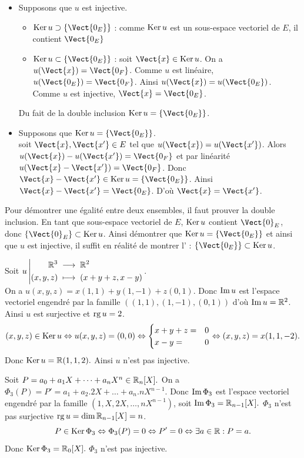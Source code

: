 \documentclass{book}
\begin{document}
\begin{Demonstration}  
\begin{itemize}
\item Supposons que $u$ est injective.
 \begin{itemize}
\item $\Ker u \supset \{\Vect{0_E}\}$ : comme $\operatorname{Ker} u$ est un sous-espace vectoriel de $E$, il contient $\Vect{0_E}$
\item $\Ker u \subset \{\Vect{0_E}\}$ : soit $\Vect{x}\in \Ker u $. On a $u(\Vect{x})=\Vect{0_F}$. Comme $u$ est linéaire, $u(\Vect{0_E})=\Vect{0_F}$. Ainsi 
$u(\Vect{x})=u(\Vect{0_E})$. Comme $u$ est injective, $\Vect{x}=\Vect{0_E}$.
\end{itemize}
Du fait de la double inclusion $\Ker u = \{\Vect{0_E}\}$.
\item  Supposons que $\Ker u = \{\Vect{0_E}\}$.\\
soit $\Vect{x},\Vect{x'}\in E $ tel que $u(\Vect{x})=u(\Vect{x'})$. Alors $u(\Vect{x})-u(\Vect{x'})=\Vect{0_F}$ et par linéarité $u(\Vect{x}-\Vect{x'})=\Vect{0_F}$. Donc $\Vect{x}-\Vect{x'}\in \Ker u= \{\Vect{0_E}\}$. Ainsi $\Vect{x}-\Vect{x'}=\Vect{0_E}$. D'où $\Vect{x}=\Vect{x'}$.
\end{itemize}
\end{Demonstration}
\begin{Texte}
Pour démontrer une égalité entre deux ensembles, il faut prouver la double inclusion.    
En tant que sous-espace vectoriel de $E$, $\operatorname{Ker} u$ contient $\Vect{0}_E$, donc $\{\Vect{0}_E\}\subset \Ker u$. Ainsi démontrer que  $\Ker u = \{\Vect{0_E}\}$
et ainsi que $u$ est injective, il suffit en réalité de
montrer l' : $\{\Vect{0_E}\}\subset \Ker u$.
\end{Texte}

\begin{Exemple}
Soit ${u}\left|\begin{aligned}{\mathbb{R}^3}&\;\longrightarrow\;{\mathbb{R}^2}\\{(x,y,z)}&\;\longmapsto\;{(x+y+z,x-y)}\end{aligned}\right.$.\\
On a $u(x,y,z)=x(1,1)+y(1,-1)+z(0,1)$.
Donc $\operatorname{Im} u$ est l'espace vectoriel engendré par la famille $((1,1),(1,-1),(0,1))$ d'où $\operatorname{Im} u=\mathbb{R}^2$. Ainsi $u$ est surjective et $\operatorname{rg} u=2$.
$$(x,y,z)\in \operatorname{Ker} u \Leftrightarrow u(x,y,z)=(0,0)  \Leftrightarrow \begin{cases}x+y+z=&0\\x-y=&0\end{cases}\Leftrightarrow(x,y,z)=x(1,1,-2).$$
Donc $\operatorname{Ker} u =\mathbb{R} (1,1,2).$ Ainsi $u$ n'est pas injective.
\end{Exemple}
\begin{Exemple}
Soit $P=a_0+a_1 X+\dots + a_n X^n \in \mathbb{R}_n[X].$
On a $\Phi_3(P)=P'=a_1+a_2 .2X+\dots  + a_n.nX^{n-1}$.
Donc $\operatorname{Im} \Phi_3$ est l'espace vectoriel engendré par la famille $(1,X,2X,\dots,nX^{n-1})$, soit $\operatorname{Im} \Phi_3=\mathbb{R}_{n-1}[X].$ $\Phi_3$ n'est pas surjective $\operatorname{rg} u=\dim \mathbb{R}_{n-1}[X]=n $.
 $$P\in \operatorname{Ker} \Phi_3  \Leftrightarrow \Phi_3(P)=0  \Leftrightarrow P'=0\Leftrightarrow \exists a\in \mathbb{R} : P=a.$$
Donc $\operatorname{Ker} \Phi_3 =\mathbb{R}_{0}[X].$ $\Phi_3$ n'est pas injective.
\end{Exemple}
\end{document}

